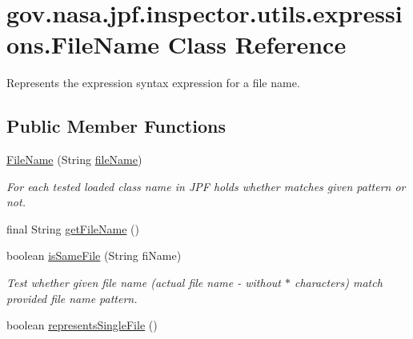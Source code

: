 \hypertarget{classgov_1_1nasa_1_1jpf_1_1inspector_1_1utils_1_1expressions_1_1_file_name}{}\section{gov.\+nasa.\+jpf.\+inspector.\+utils.\+expressions.\+File\+Name Class Reference}
\label{classgov_1_1nasa_1_1jpf_1_1inspector_1_1utils_1_1expressions_1_1_file_name}


Represents the expression syntax expression for a file name.  


\subsection*{Public Member Functions}
\begin{DoxyCompactItemize}
\item 
\hyperlink{classgov_1_1nasa_1_1jpf_1_1inspector_1_1utils_1_1expressions_1_1_file_name_a211df7822c11c5cfd53c430d58af1736}{File\+Name} (String \hyperlink{classgov_1_1nasa_1_1jpf_1_1inspector_1_1utils_1_1expressions_1_1_file_name_a2131d6d2566db269cb64fd7e7b5b914c}{file\+Name})
\begin{DoxyCompactList}\small\item\em For each tested loaded class name in J\+PF holds whether matches given pattern or not. \end{DoxyCompactList}\item 
final String \hyperlink{classgov_1_1nasa_1_1jpf_1_1inspector_1_1utils_1_1expressions_1_1_file_name_aa6173a74277aa2e86a209d3118203fa8}{get\+File\+Name} ()
\item 
boolean \hyperlink{classgov_1_1nasa_1_1jpf_1_1inspector_1_1utils_1_1expressions_1_1_file_name_ae59cfabe95a82e84be38986d817cf14e}{is\+Same\+File} (String fi\+Name)
\begin{DoxyCompactList}\small\item\em Test whether given file name (actual file name -\/ without \textquotesingle{}$\ast$\textquotesingle{} characters) match provided file name pattern. \end{DoxyCompactList}\item 
boolean \hyperlink{classgov_1_1nasa_1_1jpf_1_1inspector_1_1utils_1_1expressions_1_1_file_name_a1ee5b71283a8c613a0c72360d0914edc}{represents\+Single\+File} ()
\end{DoxyCompactItemize}
